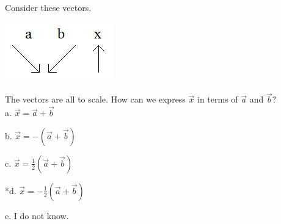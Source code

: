 
Consider these vectors.

\includegraphics[width=1.84401in,height=1.00014in]{../../Images/VectorsQ4.png}

The vectors are all to scale. How can we express \(\overrightarrow{x}\) in terms of \(\overrightarrow{a}\) and \(\overrightarrow{b}\)? \\

a. \(\overrightarrow{x} = \overrightarrow{a} + \overrightarrow{b}\)

b. \(\overrightarrow{x} = - \left( \overrightarrow{a} + \overrightarrow{b} \right)\)

c. \(\overrightarrow{x} = \frac{1}{2}\left( \overrightarrow{a} + \overrightarrow{b} \right)\)

*d. \(\overrightarrow{x} = - \frac{1}{2}\left( \overrightarrow{a} + \overrightarrow{b} \right)\)

e. I do not know. \\
